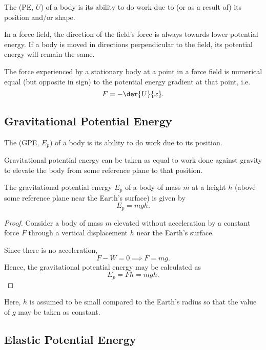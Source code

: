 \begin{definition}
    The  (PE, $U$) of a body is its ability to do work due to (or as a result of) its position and/or shape.
\end{definition}

In a force field, the direction of the field's force is always towards lower potential energy. If a body is moved in directions perpendicular to the field, its potential energy will remain the same.

The force experienced by a stationary body at a point in a force field is numerical equal (but opposite in sign) to the potential energy gradient at that point, i.e. \[F = -\der{U}{x}.\]

\subsection{Gravitational Potential Energy}

\begin{definition}
    The  (GPE, $E_p$) of a body is its ability to do work due to its position.
\end{definition}

Gravitational potential energy can be taken as equal to work done against gravity to elevate the body from some reference plane to that position.

\begin{proposition}
    The gravitational potential energy $E_p$ of a body of mass $m$ at a height $h$ (above some reference plane near the Earth's surface) is given by \[E_p = mgh.\]
\end{proposition}
\begin{proof}
    Consider a body of mass $m$ elevated without acceleration by a constant force $F$ through a vertical displacement $h$ near the Earth's surface.

    Since there is no acceleration, \[F - W = 0 \implies F = mg.\] Hence, the gravitational potential energy may be calculated as \[E_p = Fh = mgh.\]
\end{proof}

Here, $h$ is assumed to be small compared to the Earth's radius so that the value of $g$ may be taken as constant.

\subsection{Elastic Potential Energy}


